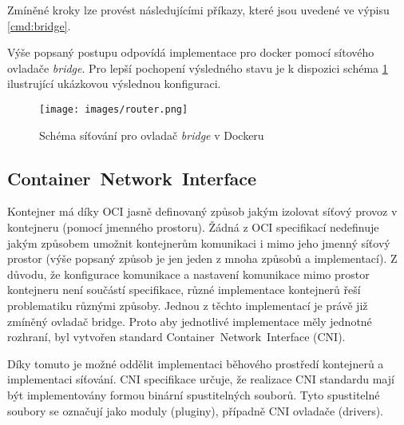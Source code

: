 Zmíněné kroky lze provést následujícími příkazy, které jsou uvedené ve výpisu \ref{cmd:bridge}.



Výše popsaný postupu odpovídá implementace pro docker pomocí sítového ovladače \textit{bridge}. Pro lepší pochopení výsledného stavu je k dispozici schéma \ref{img:ContainerNetworking} ilustrující ukázkovou výslednou konfiguraci.

\begin{figure}[ht]
\centering
\texttt{[image: images/router.png]}
\caption[Schéma síťování pro ovladač bridge v docker]{Schéma síťování pro ovladač \textit{bridge} v Dockeru \cite{velichko_2020_connecting}}\label{img:ContainerNetworking}
\end{figure}

\subsection{Container~Network~Interface}\label{cni}
Kontejner má díky OCI jasně definovaný způsob jakým izolovat síťový provoz v kontejneru (pomocí jmenného prostoru). Žádná z OCI specifikací nedefinuje jakým způsobem umožnit kontejnerům komunikaci i mimo jeho jmenný síťový prostor (výše popsaný způsob je jen jeden z mnoha způsobů a implementací). Z důvodu, že konfigurace komunikace a nastavení komunikace mimo prostor kontejneru není součástí specifikace, různé implementace kontejnerů řeší problematiku různými způsoby. Jednou z těchto implementací je právě již zmíněný ovladač bridge. Proto aby jednotlivé implementace měly jednotné rozhraní, byl vytvořen standard Container~Network~Interface (CNI).

Díky tomuto je možné oddělit implementaci běhového prostředí kontejnerů a implementaci síťování. CNI specifikace určuje, že realizace CNI standardu mají být implementovány formou binární spustitelných souborů. Tyto spustitelné soubory se označují jako moduly (pluginy), případně CNI ovladače (drivers).

